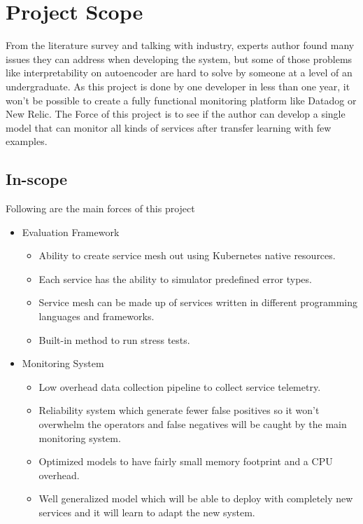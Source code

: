 \section{Project Scope}

From the literature survey and talking with industry, experts author found many issues they can address when developing the system, but some of those problems like interpretability on autoencoder \citep{ribeiro2016should} are hard to solve by someone at a level of an undergraduate. As this project is done by one developer in less than one year, it won't be possible to create a fully functional monitoring platform like Datadog or New Relic. The Force of this project is to see if the author can develop a single model that can monitor all kinds of services after transfer learning with few examples. \\


\subsection{In-scope} \label{sec:in-scope}
Following are the main forces of this project
\begin{itemize}[noitemsep,nolistsep] 
    \item Evaluation Framework
    \begin{itemize}[noitemsep,nolistsep] 
        \item Ability to create service mesh out using Kubernetes native resources.
        \item Each service has the ability to simulator predefined error types.
        \item Service mesh can be made up of services written in different programming languages and  frameworks.
        \item Built-in method to run stress tests.
    \end{itemize}
    \item Monitoring System
    \begin{itemize}[noitemsep,nolistsep]
        \item Low overhead data collection pipeline to collect service telemetry.
        \item Reliability system which generate fewer false positives so it won't overwhelm the operators and false negatives will be caught by the main monitoring system.
        \item Optimized models to have fairly small memory footprint and a CPU overhead.
        \item Well generalized model which will be able to deploy with completely new services and it will learn to adapt the new system.
    \end{itemize}
\end{itemize}


